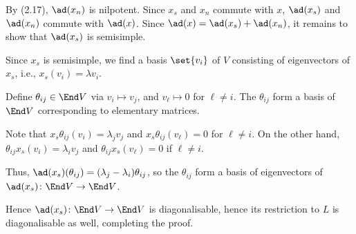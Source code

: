 By (2.17), $\ad(x_n)$ is nilpotent. Since $x_s$ and $x_n$ commute with $x$,
$\ad(x_s)$ and $\ad(x_n)$ commute with $\ad(x)$. Since $\ad(x) = \ad(x_s) + \ad(x_n)$,
it remains to show that $\ad(x_s)$ is semisimple.

Since $x_s$ is semisimple, we find a basis $\set{v_i}$ of $V$ consisting of eigenvectors
of $x_s$, i.e., $x_s(v_i) = \lambda v_i$.

Define $\theta_{ij} \in \End V$ via $v_i\mapsto v_j$, and $v_{\ell}\mapsto 0$ for
$\ell\neq i$. The $\theta_{ij}$ form a basis of $\End V$ corresponding to elementary
matrices.

Note that $x_s\theta_{ij}(v_i) = \lambda_jv_j$ and $x_s\theta_{ij}(v_{\ell}) = 0$
for $\ell\neq i$. On the other hand, $\theta_{ij}x_s(v_i) = \lambda_i v_j$ and
$\theta_{ij}x_s(v_{\ell}) = 0$ if $\ell\neq i$.

Thus, $\ad(x_s)(\theta_{ij}) = (\lambda_j - \lambda_i)\theta_{ij}$, so the
$\theta_{ij}$ form a basis of eigenvectors of $\ad(x_s)\colon \End V\to \End V$.

Hence $\ad(x_s)\colon \End V\to \End V$ is diagonalisable, hence its restriction
to $L$ is diagonalisable as well, completing the proof.
